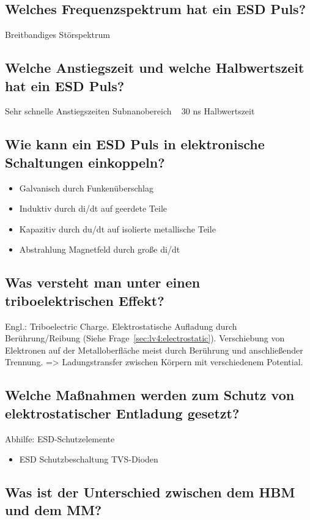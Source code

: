 \subsection{Welches Frequenzspektrum hat ein ESD Puls?}
Breitbandiges Störspektrum


\subsection{Welche Anstiegszeit und welche Halbwertszeit hat ein ESD Puls?}
Sehr schnelle Anstiegszeiten Subnanobereich
~ 30 ns Halbwertszeit

\subsection{Wie kann ein ESD Puls in elektronische Schaltungen einkoppeln?}
\begin{itemize}
  \item Galvanisch durch Funkenüberschlag
  \item Induktiv durch di/dt auf geerdete Teile
  \item Kapazitiv durch du/dt auf isolierte metallische Teile
  \item Abstrahlung Magnetfeld durch große di/dt
\end{itemize}

\subsection{Was versteht man unter einen triboelektrischen Effekt?}
Engl.: Triboelectric Charge. Elektrostatische Aufladung durch Berührung/Reibung (Siehe Frage~\ref{sec:lv4:electrostatic}). Verschiebung von Elektronen auf der Metalloberfläche meist durch Berührung und anschließender Trennung. => Ladungstransfer zwischen Körpern mit verschiedenem Potential.

\subsection{Welche Maßnahmen werden zum Schutz von elektrostatischer Entladung gesetzt?}
Abhilfe: ESD-Schutzelemente
\begin{itemize}
  \item ESD Schutzbeschaltung TVS-Dioden
\end{itemize}

\subsection{Was ist der Unterschied zwischen dem HBM und dem MM?}

